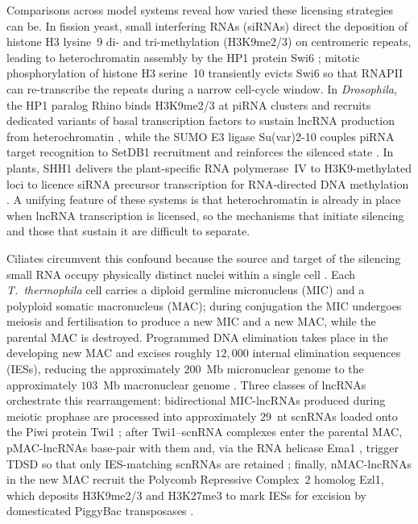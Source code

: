 \documentclass[11pt]{article}
\begin{document}
Comparisons across model systems reveal how varied these licensing
strategies can be. In fission yeast, small interfering RNAs (siRNAs)
direct the deposition of histone H3 lysine~9 di- and tri-methylation
(H3K9me2/3) on centromeric repeats, leading to heterochromatin assembly
by the HP1 protein Swi6 \citep{volpe2002rnai,hall2002heterochromatin};
mitotic phosphorylation of histone H3 serine~10 transiently evicts Swi6 so
that RNAPII can re-transcribe the repeats during a narrow cell-cycle
window. In \emph{Drosophila}, the HP1 paralog Rhino binds H3K9me2/3 at
piRNA clusters \citep{lethomas2014rhino} and recruits dedicated variants
of basal transcription factors to sustain lncRNA production from
heterochromatin \citep{andersen2017heterochromatin}, while the SUMO E3
ligase Su(var)2-10 couples piRNA target recognition to SetDB1 recruitment
and reinforces the silenced state \citep{ninova2019suvar}. In plants,
SHH1 delivers the plant-specific RNA polymerase~IV to H3K9-methylated loci
to licence siRNA precursor transcription for RNA-directed DNA methylation
\citep{law2013shh1}. A unifying feature of these systems is that
heterochromatin is already in place when lncRNA transcription is
licensed, so the mechanisms that initiate silencing and those that sustain
it are difficult to separate.

Ciliates circumvent this confound because the source and target of the
silencing small RNA occupy physically distinct nuclei within a single
cell \citep{chalker2011ciliate}. Each \emph{T.~thermophila} cell carries a
diploid germline micronucleus (MIC) and a polyploid somatic macronucleus
(MAC); during conjugation the MIC undergoes meiosis and fertilisation to
produce a new MIC and a new MAC, while the parental MAC is destroyed.
Programmed DNA elimination takes place in the developing new MAC and
excises roughly $12{,}000$ internal elimination sequences (IESs), reducing
the approximately $200$~Mb micronuclear genome to the approximately
$103$~Mb macronuclear genome \citep{cheng2010transposase,dubois2017piggymac}.
Three classes of lncRNAs orchestrate this rearrangement: bidirectional
MIC-lncRNAs produced during meiotic prophase
\citep{mochizuki2004rpb3,chalker2001nongenic} are processed into
approximately $29$~nt scnRNAs loaded onto the Piwi protein Twi1
\citep{mochizuki2002twi1,noto2010giw1}; after Twi1--scnRNA complexes enter
the parental MAC, pMAC-lncRNAs base-pair with them and, via the RNA
helicase Ema1 \citep{aronica2008ema1}, trigger TDSD so that only
IES-matching scnRNAs are retained \citep{schoeberl2012biased}; finally,
nMAC-lncRNAs in the new MAC recruit the Polycomb Repressive Complex~2
homolog Ezl1, which deposits H3K9me2/3 and H3K27me3 to mark IESs for
excision by domesticated PiggyBac transposases
\citep{liu2004h3k9,liu2007rnai,frapporti2019ezl1,cheng2010transposase,dubois2017piggymac}.
\end{document}
